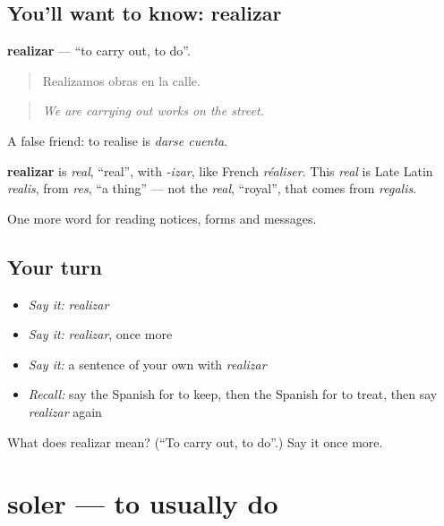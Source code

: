 \subsection*{You'll want to know: realizar}
\textbf{realizar} — \textquotedblleft{}to carry out, to do\textquotedblright{}.

\begin{quote}
Realizamos obras en la calle.
\end{quote}

\begin{quote}
\emph{We are carrying out works on the street.}
\end{quote}

A false friend: to realise is \emph{darse cuenta}.

\begin{cousinweb}
\textbf{realizar} is \emph{real}, \textquotedblleft{}real\textquotedblright{}, with \emph{-izar}, like French \emph{réaliser}. This \emph{real} is Late Latin \emph{realis}, from \emph{res}, \textquotedblleft{}a thing\textquotedblright{} — not the \emph{real}, \textquotedblleft{}royal\textquotedblright{}, that comes from \emph{regalis}.
\end{cousinweb}

\begin{grammarlens}[title={What you've built}]
One more word for reading notices, forms and messages.
\end{grammarlens}

\subsection*{Your turn}
\begin{itemize}
\raggedright
  \item \emph{Say it:} \emph{realizar}
  \item \emph{Say it:} \emph{realizar}, once more
  \item \emph{Say it:} a sentence of your own with \emph{realizar}
  \item \emph{Recall:} say the Spanish for to keep, then the Spanish for to treat, then say \emph{realizar} again
\end{itemize}

\begin{tcolorbox}[breakable,colback=teal!4,colframe=teal!35!black,title={Before you move on}]
What does realizar mean? (\textquotedblleft{}To carry out, to do\textquotedblright{}.) Say it once more.
\end{tcolorbox}
\section[soler]{soler — to usually do}

